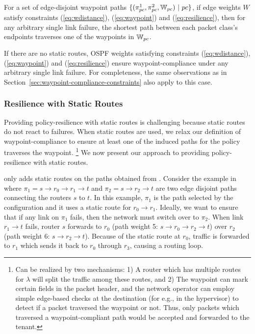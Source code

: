 \iffull
\begin{theorem}
	For a set of edge-disjoint waypoint paths $\{(\pi^1_{pc}, \pi^2_{pc}, \mathbb{W}_{pc}) ~|~ pc\}$, 
	if edge weights $W$ satisfy constraints (\ref{eq:wdistance}), (\ref{eq:waypoint}) and
	(\ref{eq:resilience}), 
	then for any arbitrary single link failure, 
	the shortest path between each packet class's 
	endpoints traverses one of the waypoints in $\mathbb{W}_{pc}$.
\end{theorem}

\fi

If there are no static routes, OSPF weights satisfying constraints 
(\ref{eq:wdistance}), (\ref{eq:waypoint}) and (\ref{eq:resilience}) ensure
waypoint-compliance under any arbitrary single link failure. For completeness, 
the same observations as in Section~\ref{sec:waypoint-compliance-constraints}
also apply to this case.  


\subsubsection{Resilience with Static Routes} \hspace*{4mm}
Providing policy-resilience with static routes is challenging
because static routes do not react to failures. When static routes
are used, we relax our definition of waypoint-compliance to 
ensure at least one of the induced paths for the policy traverses the waypoint.
\footnote{
Can be realized by two mechanisms: 1) A router
which has multiple routes for $\lambda$ will split the traffic
among these routes, and 2) The waypoint can mark certain fields in
the packet header, and the network operator can employ 
simple edge-based checks at the destination 
(for e.g., in the hypervisor) to 
detect if a packet traversed the waypoint or not. Thus, only
packets which traversed a waypoint-compliant path would be 
accepted and forwarded to the tenant. 
} We now present our approach to providing policy-resilience with
static routes. 

\name only adds static routes on the paths obtained from \genesis.
Consider the example in  where 
$\pi_1=s\rightarrow r_0 \rightarrow r_1 \rightarrow t$ 
and $\pi_2=s\rightarrow r_2 \rightarrow t$ 
are two edge disjoint paths 
connecting the routers $s$ to $t$. In this example, 
$\pi_1$ is the path selected by the configuration and it uses a static route
for $r_0 \rightarrow r_1$. 
Ideally, we want to ensure 
that if any link on $\pi_1$ fails, 
then the network must switch over to $\pi_2$. 
When link $r_1 \rightarrow t$ fails,
router $s$ forwards to $r_0$ (path weight 5: $ s \rightarrow r_0 \rightarrow r_2 \rightarrow t$)
over $r_2$ (path weight 6: $s \rightarrow r_2 \rightarrow t$). 
Because of the static route at $r_0$, traffic is forwarded
to $r_1$ which sends it back to $r_0$ through $r_3$, 
causing a routing loop. 

